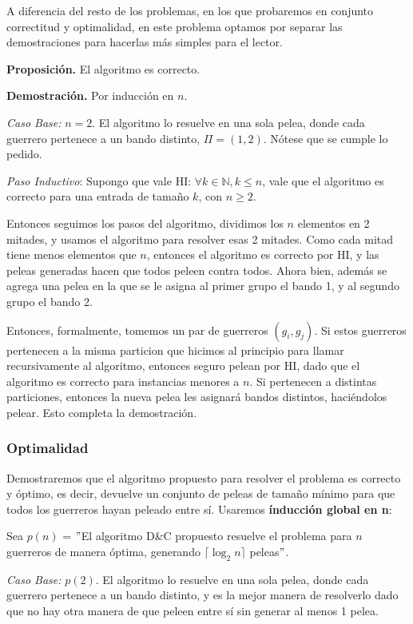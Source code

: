 A diferencia del resto de los problemas, en los que probaremos en conjunto correctitud y optimalidad, en este problema optamos por separar las demostraciones para hacerlas más simples para el lector.

\textbf{Proposición.} El algoritmo es correcto.

\textbf{Demostración.}  Por inducción en $n$.

\textit{Caso Base:} $n = 2$. El algoritmo lo resuelve en una sola pelea, donde cada guerrero pertenece a un bando distinto, $\Pi = {(1,2)}$. Nótese que se cumple lo pedido.

\textit{Paso Inductivo}: Supongo que vale HI: $\forall k \in \mathbb{N}, k \leq n$, vale que el algoritmo es correcto para una entrada de tamaño $k$, con $n \geq 2$.

Entonces seguimos los pasos del algoritmo, dividimos los $n$ elementos en 2 mitades, y usamos el algoritmo para resolver esas 2 mitades. Como cada mitad tiene menos elementos que $n$, entonces el algoritmo es correcto por HI, y las peleas generadas hacen que todos peleen contra todos. Ahora bien, además se agrega una pelea en la que se le asigna al primer grupo el bando 1, y al segundo grupo el bando 2.

Entonces, formalmente, tomemos un par de guerreros $(g_i, g_j)$. Si estos guerreros pertenecen a la misma particion que hicimos al principio para llamar recursivamente al algoritmo, entonces seguro pelean por HI, dado que el algoritmo es correcto para instancias menores a $n$. Si pertenecen a distintas particiones, entonces la nueva pelea les asignará bandos distintos, haci\'endolos pelear. Esto completa la demostración.

\subsubsection{Optimalidad}

Demostraremos que el algoritmo propuesto para resolver el problema es correcto y óptimo, es decir, devuelve un conjunto de peleas de tamaño mínimo para que todos los guerreros hayan peleado entre sí. Usaremos \textbf{índucción global en n}:

Sea $p(n)$ = $"$El algoritmo D\&C propuesto resuelve el problema para $n$ guerreros de manera óptima, generando $\lceil \log _2 n \rceil$ peleas$"$. 

\textit{Caso Base:} $p(2)$. El algoritmo lo resuelve en una sola pelea, donde cada guerrero pertenece a un bando distinto, y es la mejor manera de resolverlo dado que no hay otra manera de que peleen entre sí sin generar al menos 1 pelea.


